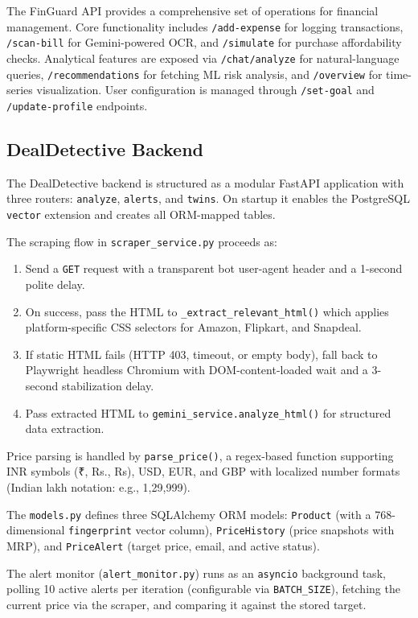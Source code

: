 \documentclass[]{IEEEtran}
\begin{document}
The FinGuard API provides a comprehensive set of operations for financial management. Core functionality includes \texttt{/add-expense} for logging transactions, \texttt{/scan-bill} for Gemini-powered OCR, and \texttt{/simulate} for purchase affordability checks. Analytical features are exposed via \texttt{/chat/analyze} for natural-language queries, \texttt{/recommendations} for fetching ML risk analysis, and \texttt{/overview} for time-series visualization. User configuration is managed through \texttt{/set-goal} and \texttt{/update-profile} endpoints.

\subsection{DealDetective Backend}

The DealDetective backend is structured as a modular FastAPI application with three routers: \texttt{analyze}, \texttt{alerts}, and \texttt{twins}. On startup it enables the PostgreSQL \texttt{vector} extension and creates all ORM-mapped tables.

The scraping flow in \texttt{scraper\_service.py} proceeds as:
\begin{enumerate}
    \item Send a \texttt{GET} request with a transparent bot user-agent header and a 1-second polite delay.
    \item On success, pass the HTML to \texttt{\_extract\_relevant\_html()} which applies platform-specific CSS selectors for Amazon, Flipkart, and Snapdeal.
    \item If static HTML fails (HTTP 403, timeout, or empty body), fall back to Playwright headless Chromium with DOM-content-loaded wait and a 3-second stabilization delay.
    \item Pass extracted HTML to \texttt{gemini\_service.analyze\_html()} for structured data extraction.
\end{enumerate}

Price parsing is handled by \texttt{parse\_price()}, a regex-based function supporting INR symbols (₹, Rs., Rs), USD, EUR, and GBP with localized number formats (Indian lakh notation: e.g., 1,29,999).

The \texttt{models.py} defines three SQLAlchemy ORM models: \texttt{Product} (with a 768-dimensional \texttt{fingerprint} vector column), \texttt{PriceHistory} (price snapshots with MRP), and \texttt{PriceAlert} (target price, email, and active status).

The alert monitor (\texttt{alert\_monitor.py}) runs as an \texttt{asyncio} background task, polling 10 active alerts per iteration (configurable via \texttt{BATCH\_SIZE}), fetching the current price via the scraper, and comparing it against the stored target.
\end{document}
